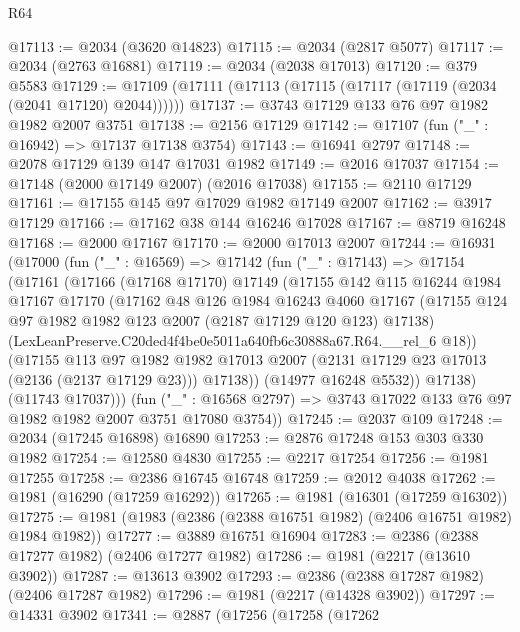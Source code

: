 \begin{lexlean}{R64}
\begin{coremodule}
@17113 := @2034 (@3620 @14823)
@17115 := @2034 (@2817 @5077)
@17117 := @2034 (@2763 @16881)
@17119 := @2034 (@2038 @17013)
@17120 := @379 @5583
@17129 := @17109 (@17111 (@17113 (@17115 (@17117 (@17119 (@2034 (@2041 @17120) @2044))))))
@17137 := @3743 @17129 @133 @76 @97 @1982 @1982 @2007 @3751
@17138 := @2156 @17129
@17142 := @17107 (fun ("_" : @16942) => @17137 @17138 @3754)
@17143 := @16941 @2797
@17148 := @2078 @17129 @139 @147 @17031 @1982
@17149 := @2016 @17037
@17154 := @17148 (@2000 @17149 @2007) (@2016 @17038)
@17155 := @2110 @17129
@17161 := @17155 @145 @97 @17029 @1982 @17149 @2007
@17162 := @3917 @17129
@17166 := @17162 @38 @144 @16246 @17028
@17167 := @8719 @16248
@17168 := @2000 @17167
@17170 := @2000 @17013 @2007
@17244 := @16931
    (@17000
      (fun ("_" : @16569) =>
      @17142
        (fun ("_" : @17143) =>
        @17154
          (@17161
            (@17166
              (@17168 @17170)
              @17149
              (@17155
                @142
                @115
                @16244
                @1984
                @17167
                @17170
                (@17162
                  @48
                  @126
                  @1984
                  @16243
                  @4060
                  @17167
                  (@17155 @124 @97 @1982 @1982 @123 @2007 (@2187 @17129 @120 @123) @17138)
                  (LexLeanPreserve.C20ded4f4be0e5011a640fb6c30888a67.R64.__rel_6 @18))
                (@17155
                  @113
                  @97
                  @1982
                  @1982
                  @17013
                  @2007
                  (@2131 @17129 @23 @17013 (@2136 (@2137 @17129 @23)))
                  @17138))
              (@14977 @16248 @5532))
            @17138)
          (@11743 @17037)))
      (fun ("_" : @16568 @2797) => @3743 @17022 @133 @76 @97 @1982 @1982 @2007 @3751 @17080 @3754))
@17245 := @2037 @109
@17248 := @2034 (@17245 @16898) @16890
@17253 := @2876 @17248 @153 @303 @330 @1982
@17254 := @12580 @4830
@17255 := @2217 @17254
@17256 := @1981 @17255
@17258 := @2386 @16745 @16748
@17259 := @2012 @4038
@17262 := @1981 (@16290 (@17259 @16292))
@17265 := @1981 (@16301 (@17259 @16302))
@17275 := @1981 (@1983 (@2386 (@2388 @16751 @1982) (@2406 @16751 @1982) @1984 @1982))
@17277 := @3889 @16751 @16904
@17283 := @2386 (@2388 @17277 @1982) (@2406 @17277 @1982)
@17286 := @1981 (@2217 (@13610 @3902))
@17287 := @13613 @3902
@17293 := @2386 (@2388 @17287 @1982) (@2406 @17287 @1982)
@17296 := @1981 (@2217 (@14328 @3902))
@17297 := @14331 @3902
@17341 := @2887
    (@17256
      (@17258
        (@17262

\end{coremodule}
\end{lexlean}
